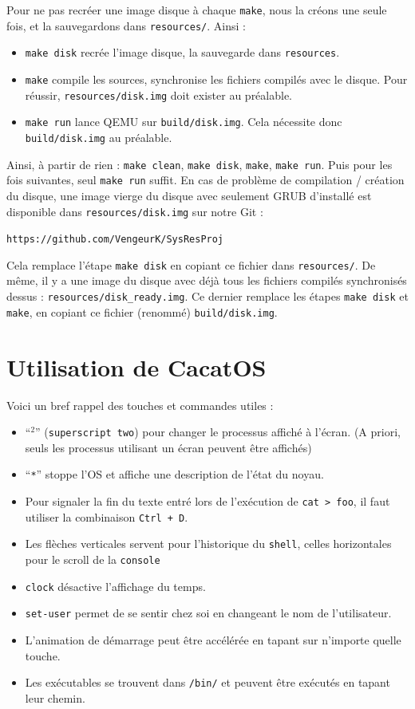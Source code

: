 \documentclass[a4paper,10pt, french]{article}
\newcommand{\code}[1]{\texttt{#1}}
\begin{document}
Pour ne pas recréer une image disque à chaque \code{make}, nous la créons une seule fois, et la sauvegardons dans \code{resources/}.
Ainsi :
\begin{itemize}
 \item \code{make disk} recrée l'image disque, la sauvegarde dans \code{resources}.
 \item \code{make} compile les sources, synchronise les fichiers compilés avec le disque. Pour réussir, \code{resources/disk.img} doit exister au préalable.
 \item \code{make run} lance QEMU sur \code{build/disk.img}. Cela nécessite donc \code{build/disk.img} au préalable.
\end{itemize}

Ainsi, à partir de rien : \code{make clean}, \code{make disk}, \code{make}, \code{make run}. Puis pour les fois suivantes, seul \code{make run} suffit.
En cas de problème de compilation / création du disque, une image vierge du disque avec seulement GRUB d'installé
est disponible dans \code{resources/disk.img} sur notre Git :
\begin{center}
 \code{https://github.com/VengeurK/SysResProj}
\end{center}
Cela remplace l'étape \code{make disk} en copiant ce fichier dans \code{resources/}. De même, il y a une image du disque avec déjà tous les fichiers compilés
synchronisés dessus : \code{resources/disk\_ready.img}.
Ce dernier remplace les étapes \code{make disk} et \code{make}, en copiant ce fichier (renommé) \code{build/disk.img}.

\section{Utilisation de CacatOS}
Voici un bref rappel des touches et commandes utiles :
\begin{itemize}
 \item ``$^2$'' (\code{superscript two}) pour changer le processus affiché à l'écran. (A priori, seuls les processus
 utilisant un écran peuvent être affichés)
 \item ``\code{*}'' stoppe l'OS et affiche une description de l'état du noyau.
 \item Pour signaler la fin du texte entré lors de l'exécution de \code{cat > foo}, il faut utiliser 
 la combinaison \code{Ctrl + D}.
 \item Les flèches verticales servent pour l'historique du \code{shell}, celles horizontales pour le scroll
 de la \code{console}
 \item \code{clock} désactive l'affichage du temps.
 \item \code{set-user} permet de se sentir chez soi en changeant le nom de l'utilisateur.
 \item L'animation de démarrage peut être accélérée en tapant sur n'importe quelle touche.
 \item Les exécutables se trouvent dans \code{/bin/} et peuvent être exécutés en tapant leur chemin.
\end{itemize}
\end{document}
